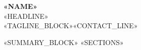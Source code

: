 \documentclass[9pt,a4paper]{extarticle}
\begin{document}
\begin{center}
  {\sffamily\bfseries\Huge\color{accent} «NAME»}\\[3pt]
  {\sffamily\large\color{textmuted} «HEADLINE»}\\[3pt]
  «TAGLINE_BLOCK»{\small «CONTACT_LINE»}
\end{center}
\vspace{2pt}

«SUMMARY_BLOCK»
«SECTIONS»
\end{document}
